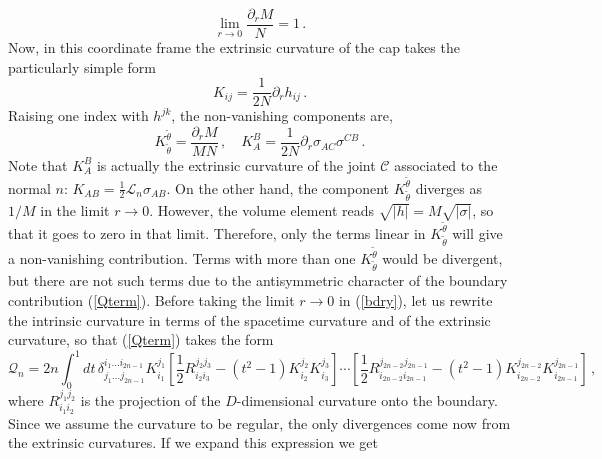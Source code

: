 \documentclass[11pt,letterpaper]{article}
\begin{document}
\begin{equation}
\lim_{r\rightarrow 0}\frac{\partial_r M}{N}=1\, .
\end{equation}
Now, in this coordinate frame the extrinsic curvature of the cap takes the particularly simple form
\begin{equation}
K_{ij}=\frac{1}{2N}\partial_r h_{ij}\, .
\end{equation}
Raising one index with $h^{jk}$, the non-vanishing components are, 
\begin{equation}
K^{\tilde \theta}_{\tilde \theta}=\frac{\partial_r M}{M N}\, ,\quad K^{B}_{A}=\frac{1}{2N}\partial_r \sigma_{AC}\sigma^{CB}\, .
\end{equation}
Note that $K^{B}_A$ is actually the extrinsic curvature of the joint $\mathcal{C}$ associated to the normal $n$: $K_{AB}=\frac{1}{2}\mathcal{L}_{n}\sigma_{AB}$.
On the other hand, the component  $K^{\tilde \theta}_{\tilde \theta}$ diverges as $1/M$ in the limit $r\rightarrow 0$. However, the volume element reads $\sqrt{|h|}=M\sqrt{|\sigma|}$, so that it goes to zero in that limit. Therefore, only the terms linear in $K^{\tilde \theta}_{\tilde \theta}$ will give a non-vanishing contribution. Terms with more than one $K^{\tilde \theta}_{\tilde \theta}$ would be divergent, but there are not such terms due to the antisymmetric character of the boundary contribution (\ref{Qterm}).
Before taking the limit $r\rightarrow 0$ in (\ref{bdry}), let us rewrite the intrinsic curvature in terms of the spacetime curvature and of the extrinsic curvature, so that (\ref{Qterm}) takes the form
\begin{equation}
\mathcal{Q}_{n}=2n\int_0^1dt\, \delta^{i_1\dots i_{2n-1}}_{j_1\dots j_{2n-1}}K^{j_1}_{i_1}\left[\frac{1}{2}R^{j_2 j_3}_{i_2i_3}- (t^2-1)K^{j_2}_{i_2}K^{j_3}_{i_3}\right]\cdots \left[\frac{1}{2}R^{j_{2n-2}j_{2n-1}}_{i_{2n-2}i_{2n-1}}- (t^2-1)K^{j_{2n-2}}_{i_{2n-2}}K^{j_{2n-1}}_{i_{2n-1}}\right]\, ,
\label{Qterm}
\end{equation}
where $R^{j_1 j_2}_{i_1i_2}$ is the projection of the $D$-dimensional curvature onto the boundary. Since we assume the curvature to be regular, the only divergences come now from the extrinsic curvatures. If we expand this expression we get
\end{document}
